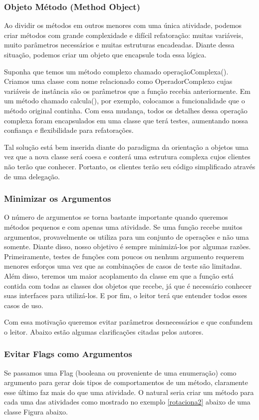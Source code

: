 \subsubsection{Objeto Método (Method Object)}
Ao dividir os métodos em outros menores com uma única atividade, podemos criar métodos com grande complexidade e difícil refatoração: muitas variáveis, muito parâmetros necessários e muitas estruturas encadeadas. Diante dessa situação, podemos criar um objeto que encapsule toda essa lógica. 
	
Suponha que temos um método complexo chamado operaçãoComplexa(). Criamos uma classe com nome relacionado como OperadorComplexo cujas variáveis de instância são os parâmetros que a função recebia anteriormente. Em um método chamado calcula(), por exemplo, colocamos a funcionalidade que o método original continha. Com essa mudança, todos os detalhes dessa operação complexa foram encapsulados em uma classe que terá testes, aumentando nossa confiança e flexibilidade para refatorações.
	
Tal solução está bem inserida diante do paradigma da orientação a objetos uma vez que a nova  classe será coesa e conterá uma estrutura complexa cujos clientes não terão que conhecer. Portanto, os clientes terão seu código simplificado através de uma delegação.

\subsubsection{Minimizar os Argumentos}
O número de argumentos se torna bastante importante quando queremos métodos pequenos e com apenas uma atividade. Se uma função recebe muitos argumentos, provavelmente os utiliza para um conjunto de operações e não uma somente. Diante disso, nosso objetivo é sempre minimizá-los por algumas razões. 	Primeiramente, testes de funções com poucos ou nenhum argumento requerem menores esforços  uma vez que as combinações de casos de teste são limitadas. Além disso, teremos um maior acoplamento da classe em que a função está contida com todas as classes dos objetos que recebe, já que é necessário conhecer suas interfaces para utilizá-los. E por fim, o leitor terá que entender todos esses casos de uso.

Com essa motivação queremos evitar parâmetros desnecessários e que confundem o leitor. Abaixo estão algumas clarificações citadas pelos autores.

\subsubsection{Evitar Flags como Argumentos}
Se passamos uma Flag (booleana ou proveniente de uma enumeração) como argumento para gerar dois tipos de comportamentos de um método, claramente esse último faz mais do que uma atividade. O natural seria criar um método para cada uma das atividades como mostrado no exemplo \ref{rotaciona2} abaixo de uma classe Figura abaixo.

